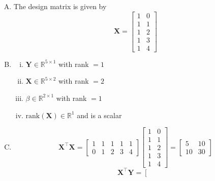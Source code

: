 \documentclass[12pt,letterpaper, onecolumn]{exam}
\begin{document}
\begin{questions}
\begin{solution}
    \begin{enumerate}[A.)]
        \item The design matrix is given by
        \begin{equation*}
            \textbf{X} = \left [\begin{array}{cc}
                1 & 0 \\
                1 & 1 \\
                1 & 2 \\
                1 & 3 \\
                1 & 4
            \end{array} \right]
        \end{equation*}
        \item \begin{enumerate}[i.)]
            \item $\textbf{Y}\in\mathbb{R}^{5\times 1}$ with rank $=1$
            \item $\textbf{X}\in\mathbb{R}^{5\times 2}$ with rank $=2$
            \item $\beta\in\mathbb{R}^{2\times 1}$ with rank $=1$
            \item $\text{rank}(\textbf{X})\in\mathbb{R}^1$ and is a scalar
        \end{enumerate}
        \item 
        \begin{equation*}
            \textbf{X}^\intercal\textbf{X} = \left [\begin{array}{ccccc}
                1 & 1 &  1 & 1 & 1 \\ 0 & 1 & 2 & 3 & 4
            \end{array} \right] \left [\begin{array}{cc}
                1 & 0 \\
                1 & 1 \\
                1 & 2 \\
                1 & 3 \\
                1 & 4
            \end{array} \right] = \left [\begin{array}{cc}
                5 & 10 \\
                10 & 30 
            \end{array} \right]
        \end{equation*}
        \begin{equation*}
            \textbf{X}^\intercal\textbf{Y} = \left [\begin{array}{ccccc}

\end{array}
\end{equation*}
\end{enumerate}
\end{solution}
\end{questions}
\end{document}
